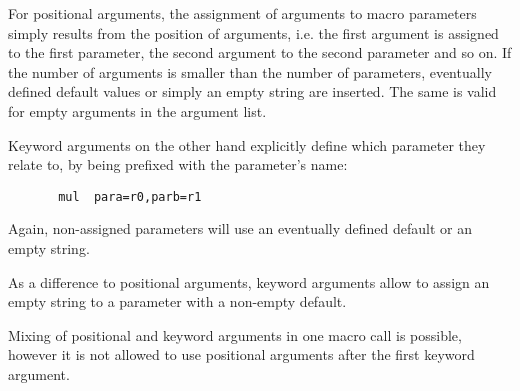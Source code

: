 \documentclass[12pt,twoside]{report}
\begin{document}
For positional arguments, the assignment of arguments to macro
parameters simply results from the position of arguments, i.e.
the first argument is assigned to the first parameter, the second
argument to the second parameter and so on.  If the number of
arguments is smaller than the number of parameters, eventually
defined default values or simply an empty string are inserted.
The same is valid for empty arguments in the argument list.

Keyword arguments on the other hand explicitly define which
parameter they relate to, by being prefixed with the parameter's
name:
\begin{verbatim}
       mul  para=r0,parb=r1
\end{verbatim}
Again, non-assigned parameters will use an eventually defined
default or an empty string.

As a difference to positional arguments, keyword arguments allow
to assign an empty string to a parameter with a non-empty
default.

Mixing of positional and keyword arguments in one macro call is
possible, however it is not allowed to use positional arguments
after the first keyword argument.
\end{document}
